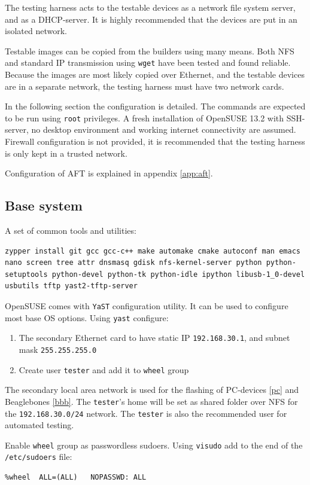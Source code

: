 \documentclass[a4paper,11pt]{article}
\newcommand{\cmd}[1]{\texttt{#1}}
\begin{document}
The testing harness acts to the testable devices as a network file system server, and as a DHCP-server. It is highly recommended that the devices are put in an isolated network.

Testable images can be copied from the builders using many means. Both NFS and standard IP transmission using \cmd{wget} have been tested and found reliable. Because the images are most likely copied over Ethernet, and the testable devices are in a separate network, the testing harness must have two network cards.

In the following section the configuration is detailed. The commands are expected to be run using \cmd{root} privileges. A fresh installation of OpenSUSE 13.2 with SSH-server, no desktop environment and working internet connectivity are assumed. Firewall configuration is not provided, it is recommended that the testing harness is only kept in a trusted network.

Configuration of AFT is explained in appendix \ref{app:aft}.

\subsection*{Base system}
A set of common tools and utilities:
\begin{lstlisting}
zypper install git gcc gcc-c++ make automake cmake autoconf man emacs nano screen tree attr dnsmasq gdisk nfs-kernel-server python python-setuptools python-devel python-tk python-idle ipython libusb-1_0-devel usbutils tftp yast2-tftp-server
\end{lstlisting}

OpenSUSE comes with \cmd{YaST} configuration utility. It can be used to configure most base OS options. Using \cmd{yast} configure:
\begin{enumerate}
\item The secondary Ethernet card to have static IP \cmd{192.168.30.1}, and subnet mask \cmd{255.255.255.0}
\item Create user \cmd{tester} and add it to \cmd{wheel} group
\end{enumerate}
The secondary local area network is used for the flashing of PC-devices  \ref{pc} and Beaglebones \ref{bbb}. The \cmd{tester}'s  home will be set as shared folder over NFS for the \cmd{192.168.30.0/24} network. The \cmd{tester} is also the recommended user for automated testing.

Enable \cmd{wheel} group as passwordless sudoers. Using \cmd{visudo} add to the end of the \cmd{/etc/sudoers} file:
\begin{lstlisting}
%wheel	ALL=(ALL)	NOPASSWD: ALL
\end{lstlisting}
\end{document}
